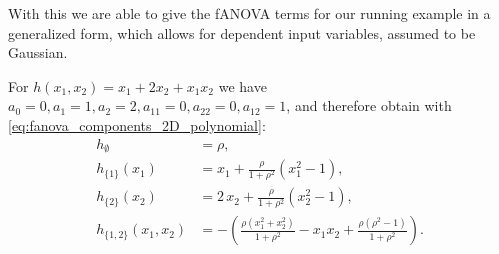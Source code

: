 With this we are able to give the fANOVA terms for our running example in a generalized form, which allows for dependent input variables, assumed to be Gaussian.\par
For $h(x_1,x_2) = x_1 + 2x_2 + x_1 x_2$  we have $a_0 = 0, a_1 = 1, a_2 = 2, a_{11} = 0, a_{22} = 0, a_{12} = 1$, and therefore obtain with \autoref{eq:fanova_components_2D_polynomial}:
\begin{align*}
h_{\emptyset} &= \rho, \\[3pt]
h_{\{1\}}(x_1) &= x_1 + \frac{\rho}{1+\rho^2}(x_1^2 - 1), \\[3pt]
h_{\{2\}}(x_2) &= 2\,x_2 + \frac{\rho}{1+\rho^2}(x_2^2 - 1), \\[3pt]
h_{\{1,2\}}(x_1,x_2) 
&= -\left(\frac{\rho(x_1^2+x_2^2)}{1+\rho^2} - x_1 x_2 + \frac{\rho(\rho^2-1)}{1+\rho^2}\right).
\end{align*}




